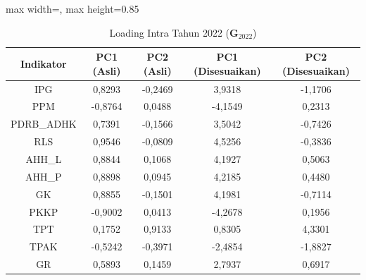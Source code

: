 \begin{table}[H]
\centering
\caption{Loading Intra Tahun 2022 ($\mathbf{G}_{2022}$)} \label{tab:app1loading_intra_2022}
\begin{adjustbox}{max width=\textwidth, max height=0.85\textheight}
\begin{tabular}{|c|c|c|c|c|}
\hline
\textbf{Indikator} & \textbf{PC1 (Asli)} & \textbf{PC2 (Asli)} & \textbf{PC1 (Disesuaikan)} & \textbf{PC2 (Disesuaikan)} \\
\hline
IPG & 0,8293 & -0,2469 & 3,9318 & -1,1706 \\
PPM & -0,8764 & 0,0488 & -4,1549 & 0,2313 \\
PDRB\_ADHK & 0,7391 & -0,1566 & 3,5042 & -0,7426 \\
RLS & 0,9546 & -0,0809 & 4,5256 & -0,3836 \\
AHH\_L & 0,8844 & 0,1068 & 4,1927 & 0,5063 \\
AHH\_P & 0,8898 & 0,0945 & 4,2185 & 0,4480 \\
GK & 0,8855 & -0,1501 & 4,1981 & -0,7114 \\
PKKP & -0,9002 & 0,0413 & -4,2678 & 0,1956 \\
TPT & 0,1752 & 0,9133 & 0,8305 & 4,3301 \\
TPAK & -0,5242 & -0,3971 & -2,4854 & -1,8827 \\
GR & 0,5893 & 0,1459 & 2,7937 & 0,6917 \\
\hline
\end{tabular}
\end{adjustbox}
\end{table}